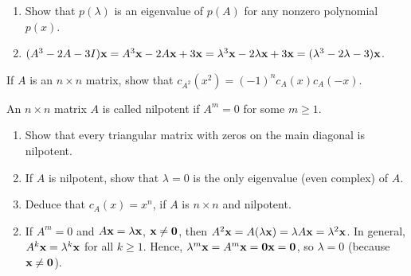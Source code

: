 \begin{multicols}{2}
\begin{ex}
\begin{enumerate}[label={\alph*.}]
\item Show that $p(\lambda)$ is an eigenvalue of $p(A)$ for any nonzero polynomial $p(x)$.

\end{enumerate}
\begin{sol}
\begin{enumerate}[label={\alph*.}]
\setcounter{enumi}{1}
\item  $(A^{3} - 2A - 3I)\textbf{x} = A^{3}\textbf{x} - 2A\textbf{x} + 3\textbf{x} = \lambda^{3}\textbf{x} - 2\lambda\textbf{x} + 3\textbf{x} = (\lambda^{3} - 2\lambda - 3)\textbf{x}$.

\end{enumerate}
\end{sol}
\end{ex}

\begin{ex}
If $A$ is an $n \times n$ matrix, show that $c_{A^2}(x^{2}) = (-1)^{n}c_{A}(x)c_{A}(-x)$.
\end{ex}

\begin{ex}
An $n \times n$ matrix $A$ is called nilpotent if $A^{m} = 0$ for some $m \geq 1$.


\begin{enumerate}[label={\alph*.}]
\item Show that every triangular matrix with zeros on the main diagonal is nilpotent.

\item If $A$ is nilpotent, show that $\lambda = 0$ is the only eigenvalue (even complex) of $A$.

\item Deduce that $c_{A}(x) = x^{n}$, if $A$ is $n \times n$ and nilpotent.

\end{enumerate}
\begin{sol}
\begin{enumerate}[label={\alph*.}]
\setcounter{enumi}{1}
\item  If $A^{m} = 0$ and $A\textbf{x} = \lambda\textbf{x}$, $\textbf{x} \neq \textbf{0}$, then $A^{2}\textbf{x} = A(\lambda\textbf{x}) = \lambda A\textbf{x} = \lambda^{2}\textbf{x}$. In general, $A^{k}\textbf{x} = \lambda^{k}\textbf{x}$ for all $k \geq 1$. Hence, $\lambda^{m}\textbf{x} = A^{m}\textbf{x} = \textbf{0}\textbf{x} = \textbf{0}$, so $\lambda = 0$ (because $\textbf{x} \neq \textbf{0}$).

\end{enumerate}
\end{sol}
\end{ex}


\end{multicols}
